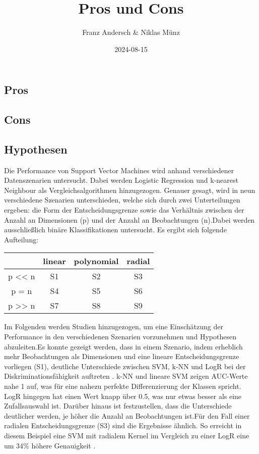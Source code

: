 \documentclass[
]{article}
\title{Pros und Cons}
\author{Franz Andersch \& Niklas Münz}
\date{2024-08-15}
\renewcommand{\maketitle}{}
\begin{document}
\maketitle

\subsection{Pros}

\subsection{Cons}

\subsection{Hypothesen}

Die Performance von Support Vector Machines wird anhand verschiedener
Datenszenarien untersucht. Dabei werden Logistic Regression und
k-nearest Neighbour als Vergleichsalgorithmen hinzugezogen. Genauer
gesagt, wird in neun verschiedene Szenarien unterschieden, welche sich
durch zwei Unterteilungen ergeben: die Form der Entscheidungsgrenze
sowie das Verhältnis zwischen der Anzahl an Dimensionen (p) und der
Anzahl an Beobachtungen (n).Dabei werden ausschließlich binäre
Klassifikationen untersucht. Es ergibt sich folgende Aufteilung:

\begin{center}
\begin{tabular}{ |c|c|c|c| }
 \hline
  & linear & polynomial & radial \\
 \hline
 p << n & S1 & S2 & S3 \\
 \hline
 p = n & S4 & S5 & S6 \\
 \hline
 p >> n & S7 & S8 & S9 \\
 \hline
\end{tabular}
\end{center}

Im Folgenden werden Studien hinzugezogen, um eine Einschätzung der
Performance in den verschiedenen Szenarien vorzunehmen und Hypothesen
abzuleiten.\newline Es konnte gezeigt werden, dass in einem Szenario,
indem erheblich mehr Beobachtungen als Dimensionen und eine lineare
Entscheidungsgrenze vorliegen (S1), deutliche Unterschiede zwischen SVM,
k-NN und LogR bei der Diskriminationsfähigkeit auftreten
\parencite{entezari-malekiComparisonClassificationMethods2009}. k-NN und
lineare SVM zeigen AUC-Werte nahe 1 auf, was für eine nahezu perfekte
Differenzierung der Klassen spricht. LogR hingegen hat einen Wert knapp
über 0.5, was nur etwas besser als eine Zufallsauswahl ist. Darüber
hinaus ist festzustellen, dass die Unterschiede deutlicher werden, je
höher die Anzahl an Beobachtungen ist.\newline Für den Fall einer
radialen Entscheidungsgrenze (S3) sind die Ergebnisse ähnlich. So
erreicht in diesem Beispiel eine SVM mit radialem Kernel im Vergleich zu
einer LogR eine um 34\% höhere Genauigkeit
\parencite{faveroClassificationPerformanceEvaluation2022}.
\end{document}
